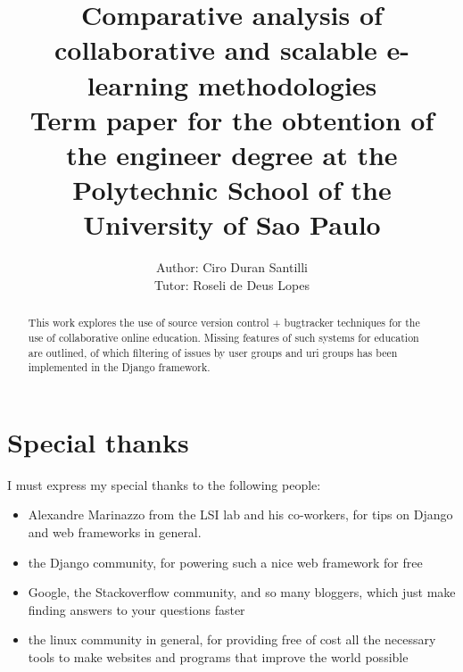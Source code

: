 \documentclass[12pt]{article}
\title{Comparative analysis of collaborative and scalable e-learning methodologies\\[1cm]
{\large Term paper for the obtention of the engineer degree at the Polytechnic School of the University of Sao Paulo }
}
\author{Author: Ciro Duran Santilli\\
Tutor: Roseli de Deus Lopes
}
\begin{document}
\begin{comment}
TODO simple top use cases
TODO bugtracker alexandre:

* trac
* bugzilla
* redmine

* sakai

* launchpad

descricao do sistema

use cases
requisitos funcionais/nao funcionais

keyword: project management

difficulty: multiple login

\newpage
\end{comment}

\maketitle
\newpage

\begin{abstract}This work explores the use of source version control + bugtracker techniques for 
the use of collaborative online education. Missing features of such systems for education are
outlined, of which filtering of issues by user groups and uri groups has been implemented in the Django framework.
\end{abstract}
\newpage

\tableofcontents
\newpage

\section{Special thanks} \label{special-thanks}

I must express my special thanks to the following people:

\begin{itemize}
  \item Alexandre Marinazzo from the LSI lab and his co-workers, for tips on Django and web frameworks in general.
  \item the Django community, for powering such a nice web framework for free
  \item Google, the Stackoverflow community, and so many bloggers, which just make finding answers to your questions faster
  \item the linux community in general, for providing free of cost all the necessary tools
      to make websites and programs that improve the world possible
\end{itemize}
\newpage
\end{document}
